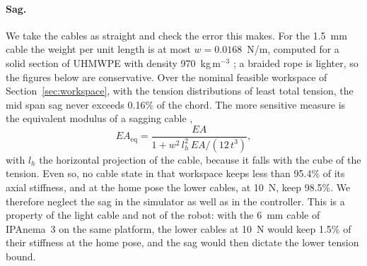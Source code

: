 \documentclass[10pt]{article}
\begin{document}
\paragraph{Sag.} We take the cables as straight and check the error this makes. For the 1.5~mm cable the weight per unit length is at most $w=0.0168$~N/m, computed for a solid section of UHMWPE with density 970~kg\,m$^{-3}$ \citep{hwangbo2018cable}; a braided rope is lighter, so the figures below are conservative. Over the nominal feasible workspace of Section~\ref{sec:workspace}, with the tension distributions of least total tension, the mid span sag never exceeds 0.16\% of the chord. The more sensitive measure is the equivalent modulus of a sagging cable \citep{ernst1965},
\begin{equation}\label{eq:ernst}
EA_{\mathrm{eq}}=\frac{EA}{1+w^2\,l_h^2\,EA/(12\,t^3)},
\end{equation}
with $l_h$ the horizontal projection of the cable, because it falls with the cube of the tension. Even so, no cable state in that workspace keeps less than 95.4\% of its axial stiffness, and at the home pose the lower cables, at 10~N, keep 98.5\%. We therefore neglect the sag in the simulator as well as in the controller. This is a property of the light cable and not of the robot: with the 6~mm cable of IPAnema~3 on the same platform, the lower cables at 10~N would keep 1.5\% of their stiffness at the home pose, and the sag would then dictate the lower tension bound.
\end{document}
